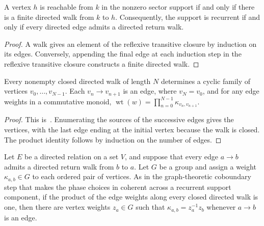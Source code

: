 \begin{lemma}%
    \label{lem:mpdo_eta_reachability_equivalence}
    \leanok
    A vertex $h$ is reachable from $k$ in the nonzero sector support if and
    only if there is a finite directed walk from $k$ to $h$. Consequently,
    the support is recurrent if and only if every directed edge admits a
    directed return walk.
\end{lemma}

\begin{proof}
    \leanok
    A walk gives an element of the reflexive transitive closure by induction
    on its edges. Conversely, appending the final edge at each induction step
    in the reflexive transitive closure constructs a finite directed walk.
\end{proof}

\begin{lemma}%
    \label{lem:directed_closed_walk_finite_cycle}
    \leanok
    Every nonempty closed directed walk of length $N$ determines a cyclic
    family of vertices $v_0,\ldots,v_{N-1}$. Each $v_n\to v_{n+1}$ is an
    edge, where $v_N=v_0$, and for any edge weights in a commutative monoid,
    $\operatorname{wt}(w)=\prod_{n=0}^{N-1}\kappa_{v_n,v_{n+1}}$.
\end{lemma}

\begin{proof}
    \leanok
    This is~\cite[``Finite cyclic form of a closed directed
        walk'']{QICLean2026Blueprint}.
    Enumerating the sources of the successive edges gives the vertices, with
    the last edge ending at the initial vertex because the walk is closed. The
    product identity follows by induction on the number of edges.
\end{proof}

\begin{lemma}%
    \label{thm:directed_cycle_coboundary}
    \leanok
    Let $E$ be a directed relation on a set $V$, and suppose that every edge
    $a\to b$ admits a directed return walk from $b$ to $a$. Let $G$ be a
    group and assign a weight $\kappa_{a,b}\in G$ to each ordered
    pair of vertices. As in the graph-theoretic coboundary step that makes the
    phase choices in \cite[Appendix~C.2, lines~1446--1450]{Cirac2016MPDO_arXiv}
    coherent across a recurrent support component, if the product of the edge
    weights along every closed directed walk is one, then there are vertex
    weights $z_a\in G$ such that $\kappa_{a,b}=z_a^{-1}z_b$ whenever $a\to b$
    is an edge.
\end{lemma}

